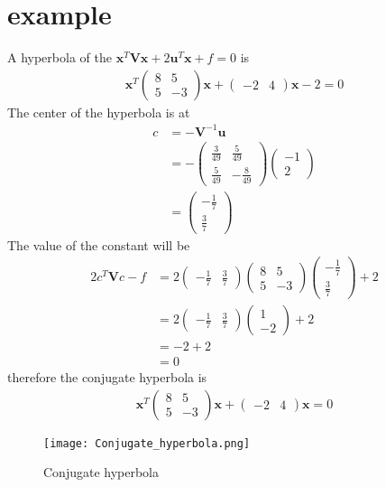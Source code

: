 \documentclass[journal,12pt,twocolumn]{IEEEtran}
\newcommand{\myvec}[1]{\ensuremath{\begin{pmatrix}#1\end{pmatrix}}}
\numberwithin{equation}{subsection}
\let\vec\mathbf
\begin{document}
\section{example}
A hyperbola of the $\vec{x}^T\vec{V}\vec{x}+2\vec{u}^T\vec{x}+f=0$ is
\begin{align}
    \vec{x}^T\myvec{8&5\\5&-3}\vec{x}+\myvec{-2&4}\vec{x}-2=0
\end{align}
The center of the hyperbola is at
\begin{align}
    c&=-\vec{V}^{-1}\vec{u}\\
    &=-\myvec{\frac{3}{49}&\frac{5}{49}\\\frac{5}{49}&-\frac{8}{49}}\myvec{-1\\2}\\
    &=\myvec{-\frac{1}{7}\\\frac{3}{7}}
\end{align}
The value of the constant will be
\begin{align}
    2c^T\vec{V}c-f&=2\myvec{-\frac{1}{7}&\frac{3}{7}}\myvec{8&5\\5&-3}\myvec{-\frac{1}{7}\\\frac{3}{7}}+2\\
    &=2\myvec{-\frac{1}{7}&\frac{3}{7}}\myvec{1\\-2}+2\\
    &=-2+2\\
    &=0
\end{align}
therefore the conjugate hyperbola is 
\begin{align}
    \vec{x}^T\myvec{8&5\\5&-3}\vec{x}+\myvec{-2&4}\vec{x}=0
\end{align}
\begin{figure}[h]
    \centering
    \texttt{[image: Conjugate\_hyperbola.png]}
    \caption{Conjugate hyperbola}
    \label{fig:my_label}
\end{figure}
\end{document}
